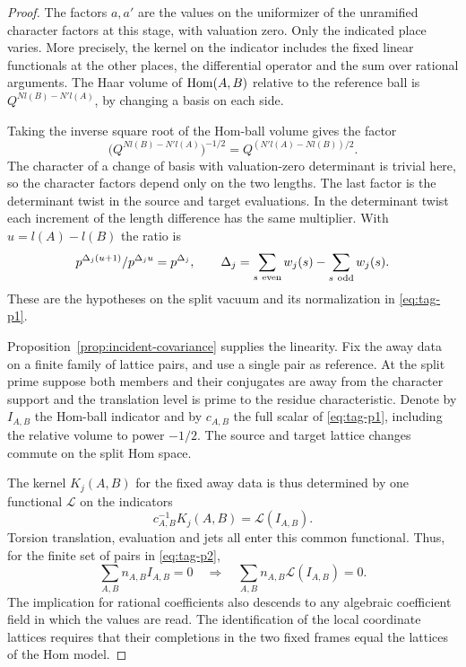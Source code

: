 \begin{proof}

The factors \(a,a'\) are the values on the uniformizer of the
unramified character factors at this stage, with valuation zero.
Only the indicated place varies. More precisely, the kernel on
the indicator includes the fixed linear functionals at the other places, the differential operator and the sum over rational
arguments. The Haar volume of \({\rm Hom}(A,B)\) relative to the
reference ball is \(Q^{Nl(B)-N'l(A)}\), by changing a basis on
each side.

Taking the inverse square root of the Hom-ball volume gives the factor
\[
  \big(Q^{N l(B)-N'l(A)}\big)^{-1/2}=Q^{(N'l(A)-N l(B))/2}.
\]
 The
character of a change of basis with valuation-zero determinant is
trivial here, so the character factors depend only on the two
lengths. The last factor is the determinant twist in the source and target evaluations. In the determinant twist each increment of the length difference has the same multiplier. With \(u=l(A)-l(B)\) the ratio is
\[
  p^{\Delta_j(u+1)}/p^{\Delta_j u}=p^{\Delta_j},\qquad \Delta_j=\sum_{s\ {\rm even}}w_j(s)-\sum_{s\ {\rm odd}}w_j(s).
\]
 These are the hypotheses on the split vacuum
and its normalization in \eqref{eq:tag-p1}.


Proposition~\ref{prop:incident-covariance} supplies the linearity.
Fix the away data on a finite family of lattice pairs, and
use a single pair as reference. At the split prime suppose both members and their conjugates
are away from the character support and the translation level
is prime to the residue characteristic. Denote by \(I_{A,B}\)
the Hom-ball indicator and by \(c_{A,B}\) the full scalar of
\eqref{eq:tag-p1}, including the relative volume to power \(-1/2\).
The source and target lattice changes commute on the split Hom
space.

The kernel \(K_j(A,B)\) for the fixed away data is thus determined by one functional \(\mathcal L\) on the indicators
\[
  c_{A,B}^{-1}K_j(A,B)=\mathcal L(I_{A,B}).
\]
Torsion translation, evaluation and jets all enter this common functional. Thus, for the finite set of pairs in \eqref{eq:tag-p2},
\[
 \sum_{A,B}n_{A,B}I_{A,B}=0
 \quad\Longrightarrow\quad
 \sum_{A,B}n_{A,B}\mathcal L(I_{A,B})=0 .
\]
The implication for rational coefficients also descends to any
algebraic coefficient field in which the values are read.
The identification of the local coordinate lattices requires
that their completions in the two fixed frames equal the lattices
of the Hom model.


\end{proof}
